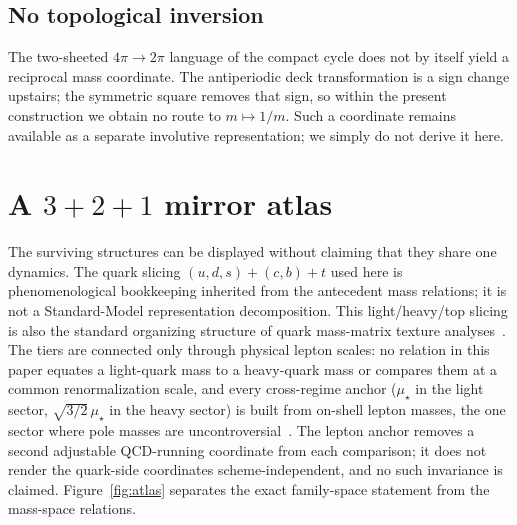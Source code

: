 \documentclass[aps,twocolumn,superscriptaddress,nofootinbib,floatfix]{revtex4-2}
\newcommand{\mstar}{\mu_\star}
\begin{document}
\subsection{No topological inversion}

The two-sheeted $4\pi\to2\pi$ language of the compact cycle does not by itself yield a reciprocal mass coordinate. The antiperiodic deck transformation is a sign change upstairs; the symmetric square removes that sign, so within the present construction we obtain no route to $m\mapsto1/m$. Such a coordinate remains available as a separate involutive representation; we simply do not derive it here.

\section{A $3+2+1$ mirror atlas}
\label{sec:atlas}

The surviving structures can be displayed without claiming that they share one dynamics. The quark slicing $(u,d,s)+(c,b)+t$ used here is phenomenological bookkeeping inherited from the antecedent mass relations; it is not a Standard-Model representation decomposition. This light/heavy/top slicing is also the standard organizing structure of quark mass-matrix texture analyses~\cite{FritzschXing2000}. The tiers are connected only through physical lepton scales: no relation in this paper equates a light-quark mass to a heavy-quark mass or compares them at a common renormalization scale, and every cross-regime anchor ($\mstar$ in the light sector, $\sqrt{3/2}\,\mstar$ in the heavy sector) is built from on-shell lepton masses, the one sector where pole masses are uncontroversial~\cite{PDG2026}. The lepton anchor removes a second adjustable QCD-running coordinate from each comparison; it does not render the quark-side coordinates scheme-independent, and no such invariance is claimed. Figure~\ref{fig:atlas} separates the exact family-space statement from the mass-space relations.
\end{document}
